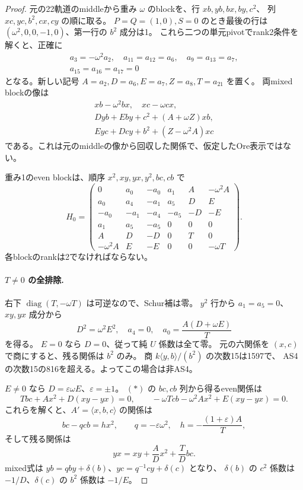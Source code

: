 \begin{proof}
元の22軌道のmiddleから重み $\omega$ のblockを、行 $xb,yb,bx,by,c^2$、
列 $xc,yc,b^2,cx,cy$ の順に取る。
$P=Q=(1,0),S=0$ のとき最後の行は
$(\omega^2,0,0,-1,0)$、第一行の $b^2$ 成分は1。
これら二つの単元pivotでrank2条件を解くと、正確に
\[
\begin{gathered}
 a_3=-\omega^2a_2,\quad
 a_{11}=a_{12}=a_6,\quad a_9=a_{13}=a_7,\\
 a_{15}=a_{16}=a_{17}=0
\end{gathered}
\]
となる。新しい記号 $A=a_2,D=a_6,E=a_7,Z=a_8,T=a_{21}$ を置く。
両mixed blockの像は
\begin{gather*}
 xb-\omega^2bx,\quad xc-\omega cx,\\
 Dyb+Eby+c^2+(A+\omega Z)xb,\\
 Eyc+Dcy+b^2+(Z-\omega^2A)xc
\end{gather*}
である。これは元のmiddleの像から回収した関係で、仮定したOre表示ではない。

重み1のeven blockは、順序 $x^2,xy,yx,y^2,bc,cb$ で
\[
 H_0=\begin{pmatrix}
0&a_0&-a_0&a_1&A&-\omega^2 A\\
a_0&a_4&-a_1&a_5&D&E\\
-a_0&-a_1&-a_4&-a_5&-D&-E\\
a_1&a_5&-a_5&0&0&0\\
A&D&-D&0&T&0\\
-\omega^2 A&E&-E&0&0&-\omega T
\end{pmatrix}.
\tag{*}
\]
各blockのrankは2でなければならない。

\paragraph{$T\ne0$ の全排除.}
右下 $\operatorname{diag}(T,-\omega T)$ は可逆なので、Schur補は零。
$y^2$ 行から $a_1=a_5=0$、$xy,yx$ 成分から
\[
 D^2=\omega^2E^2,\quad a_4=0,\quad
 a_0=\frac{A(D+\omega E)}T
\]
を得る。
$E=0$ なら $D=0$、従って純 $U$ 係数は全て零。
元の六関係を $(x,c)$ で商にすると、残る関係は $b^2$ のみ。
商 $k\langle y,b\rangle/(b^2)$ の次数15は1597で、
AS4の次数15の816を超える。よってこの場合は非AS4。

$E\ne0$ なら $D=\varepsilon\omega E$、$\varepsilon=\pm1$。
$(*)$ の $bc,cb$ 列から得るeven関係は
\[
 Tbc+A x^2+D(xy-yx)=0,\qquad
 -\omega Tcb-\omega^2A x^2+E(xy-yx)=0.
\]
これらを解くと、$A'=\langle x,b,c\rangle$ の関係は
\[
 bc-qcb=h x^2,\qquad
 q=-\varepsilon\omega^2,\quad h=-\frac{(1+\varepsilon)A}{T},
\]
そして残る関係は
\[
 yx=xy+\frac ADx^2+\frac TD bc.
\]
mixed式は $yb=qby+\delta(b)$、$yc=q^{-1}cy+\delta(c)$ となり、
$\delta(b)$ の $c^2$ 係数は $-1/D$、$\delta(c)$ の $b^2$ 係数は $-1/E$。


\end{proof}
